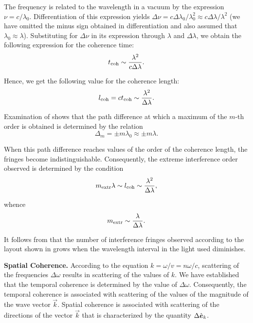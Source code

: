 The frequency is related to the wavelength in a vacuum by the expression $\nu=c/\lambda_0$.
Differentiation of this expression yields $\Delta{\nu}=c\Delta{\lambda_0}/\lambda_0^2 \approx c \Delta{\lambda}/\lambda^2$ (we have omitted the minus sign obtained in differentiation and also assumed that $\lambda_0\approx\lambda$).
Substituting for $\Delta{\nu}$ in  its expression through $\lambda$ and $\Delta{\lambda}$, we obtain the following
expression for the coherence time:
\begin{equation}\label{eq:17_20}
    t_{\text{coh}} \sim \frac{\lambda^2}{c \Delta{\lambda}}.
\end{equation}

\noindent
Hence, we get the following value for the coherence length:
\begin{equation}\label{eq:17_21}
    l_{\text{coh}} = c t_{\text{coh}} \sim \frac{\lambda^2}{\Delta{\lambda}}.
\end{equation}

Examination of  shows that the path difference at which a maximum of the $m$-th order is obtained is determined by the relation
\begin{equation*}
    \Delta_m = \pm m \lambda_0 \approx \pm m \lambda.
\end{equation*}

\noindent
When this path difference reaches values of the order of the coherence length, the fringes become indistinguishable.
Consequently, the extreme interference order observed is determined by the condition
\begin{equation*}
    m_{\text{extr}} \lambda \sim l_{\text{coh}} \sim \frac{\lambda^2}{\Delta{\lambda}},
\end{equation*}

\noindent
whence
\begin{equation}\label{eq:17_22}
    m_{\text{extr}} \sim \frac{\lambda}{\Delta{\lambda}}.
\end{equation}

\noindent
It follows from  that the number of interference fringes observed according to the layout shown in  grows when the wavelength interval in the light used diminishes.

\textbf{Spatial Coherence.}
According to the equation $k=\omega/v = n\omega/c$, scattering of the frequencies $\Delta{\omega}$ results in scattering of the values of $k$.
We have established that the temporal coherence is determined by the value of $\Delta{\omega}$.
Consequently, the temporal coherence is associated
with scattering of the values of the magnitude of the wave vector $\vec{k}$.
Spatial coherence is associated with scattering of the directions of the vector $\vec{k}$ that is characterized by the quantity $\Delta{\hat{\boldsymbol{e}}_{k}}$.

